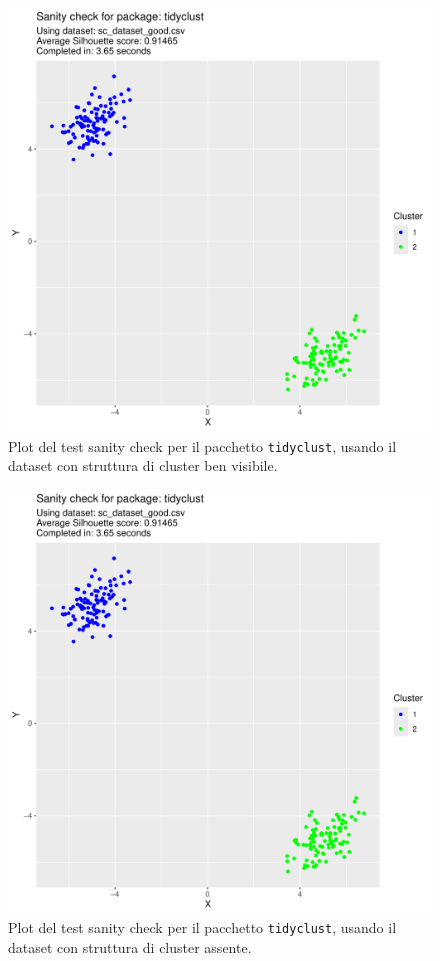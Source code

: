 \documentclass[italian]{article}
\begin{document}
			\begin{figure}[h]
				\includegraphics[width = \textwidth, page = 1]{results/results_TIDYCLUST.pdf}
				\caption{Plot del test sanity check per il pacchetto \texttt{tidyclust},
				usando il dataset con struttura di cluster ben visibile.}
				\label{fig:tidyclustgood}
			\end{figure}

			\begin{figure}[h]
				\includegraphics[width = \textwidth, page = 2]{results/results_TIDYCLUST.pdf}
				\caption{Plot del test sanity check per il pacchetto \texttt{tidyclust},
				usando il dataset con struttura di cluster assente.}
				\label{fig:tidyclustbad}
			\end{figure}
\end{document}
